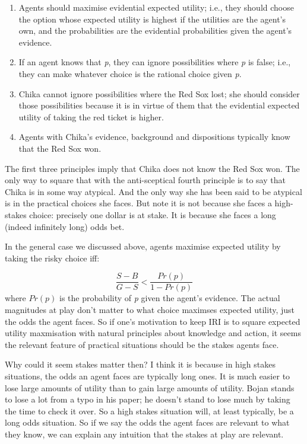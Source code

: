 \begin{enumerate}
\item Agents should maximise evidential expected utility; i.e., they should choose the option whose expected utility is highest if the utilities are the agent's own, and the probabilities are the evidential probabilities given the agent's evidence.

\item If an agent knows that \emph{p}, they can ignore possibilities where \emph{p} is false; i.e., they can make whatever choice is the rational choice given \emph{p}.

\item Chika cannot ignore possibilities where the Red Sox lost; she should consider those possibilities because it is in virtue of them that the evidential expected utility of taking the red ticket is higher.

\item Agents with Chika's evidence, background and dispositions typically know that the Red Sox won.

\end{enumerate}
The first three principles imply that Chika does not know the Red Sox won. The only way to square that with the anti-sceptical fourth principle is to say that Chika is in some way atypical. And the only way she has been said to be atypical is in the practical choices she faces. But note it is not because she faces a high-stakes choice: precisely one dollar is at stake. It is because she faces a long (indeed infinitely long) odds bet.

In the general case we discussed above, agents maximise expected utility by taking the risky choice iff:

$$\frac{S-B}{G-S} < \frac{Pr(p)}{1-Pr(p)}$$
where $Pr(p)$ is the probability of \emph{p} given the agent's evidence. The actual magnitudes at play don't matter to what choice maximses expected utility, just the odds the agent faces. So if one's motivation to keep IRI is to square expected utility maxmisation with natural principles about knowledge and action, it seems the relevant feature of practical situations should be the stakes agents face.

Why could it seem stakes matter then? I think it is because in high stakes situations, the odds an agent faces are typically long ones. It is much easier to lose large amounts of utility than to gain large amounts of utility. Bojan stands to lose a lot from a typo in his paper; he doesn't stand to lose much by taking the time to check it over. So a high stakes situation will, at least typically, be a long odds situation. So if we say the odds the agent faces are relevant to what they know, we can explain any intuition that the stakes at play are relevant.

